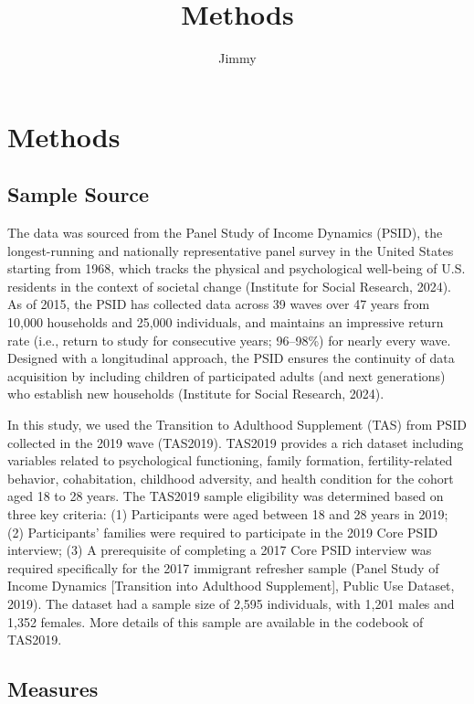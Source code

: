 \documentclass[
  man]{apa7}
\title{Methods}
\author{Jimmy\textsuperscript{}}
\date{}
\affiliation{\phantom{0}}
\begin{document}
\maketitle

\hypertarget{methods}{%
\section{Methods}\label{methods}}

\hypertarget{sample-source}{%
\subsection{Sample Source}\label{sample-source}}

The data was sourced from the Panel Study of Income Dynamics (PSID), the longest-running and nationally representative panel survey in the United States starting from 1968, which tracks the physical and psychological well-being of U.S. residents in the context of societal change (Institute for Social Research, 2024). As of 2015, the PSID has collected data across 39 waves over 47 years from 10,000 households and 25,000 individuals, and maintains an impressive return rate (i.e., return to study for consecutive years; 96--98\%) for nearly every wave. Designed with a longitudinal approach, the PSID ensures the continuity of data acquisition by including children of participated adults (and next generations) who establish new households (Institute for Social Research, 2024).

In this study, we used the Transition to Adulthood Supplement (TAS) from PSID collected in the 2019 wave (TAS2019). TAS2019 provides a rich dataset including variables related to psychological functioning, family formation, fertility-related behavior, cohabitation, childhood adversity, and health condition for the cohort aged 18 to 28 years. The TAS2019 sample eligibility was determined based on three key criteria: (1) Participants were aged between 18 and 28 years in 2019; (2) Participants' families were required to participate in the 2019 Core PSID interview; (3) A prerequisite of completing a 2017 Core PSID interview was required specifically for the 2017 immigrant refresher sample (Panel Study of Income Dynamics {[}Transition into Adulthood Supplement{]}, Public Use Dataset, 2019). The dataset had a sample size of 2,595 individuals, with 1,201 males and 1,352 females. More details of this sample are available in the codebook of TAS2019.

\hypertarget{measures}{%
\subsection{Measures}\label{measures}}
\end{document}
